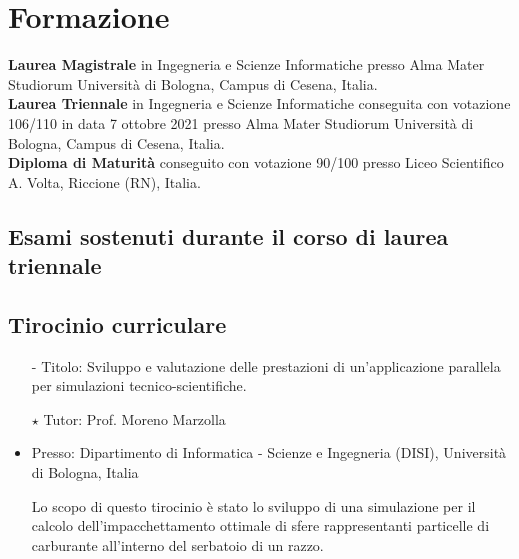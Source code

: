 \documentclass[curriculum-vitae]{subfiles}
\begin{document}
	\section*{Formazione}
		 \textbf{Laurea Magistrale} in Ingegneria e Scienze Informatiche presso Alma Mater Studiorum Università di Bologna, Campus di Cesena, Italia.\\
		
		 \textbf{Laurea Triennale} in Ingegneria e Scienze Informatiche conseguita con votazione 106/110 in data 7 ottobre 2021 presso Alma Mater Studiorum Università di Bologna, Campus di Cesena, Italia.\\

		 \textbf{Diploma di Maturità} conseguito con votazione 90/100 presso Liceo Scientifico A. Volta, Riccione (RN), Italia.
		
		\subsection*{Esami sostenuti durante il corso di laurea triennale}
			\begin{minipage}[t]{.47\textwidth}
			\end{minipage}
			\hfill
			\begin{minipage}[t]{.47\textwidth}
			\end{minipage}
		
		\subsection*{Tirocinio curriculare}
			\begin{itemize}
				\item[-] {\large Titolo:} Sviluppo e valutazione delle prestazioni di un'applicazione parallela per simulazioni tecnico-scientifiche.
				\item[$\star$] {\large Tutor:} Prof. Moreno Marzolla
				\item {\large Presso:} Dipartimento di Informatica - Scienze e Ingegneria (DISI), Università di Bologna, Italia
				\item[] Lo scopo di questo tirocinio è stato lo sviluppo di una simulazione per il calcolo dell'impacchettamento ottimale di sfere rappresentanti particelle di carburante all'interno del serbatoio di un razzo.
			\end{itemize}
		
\end{document}
